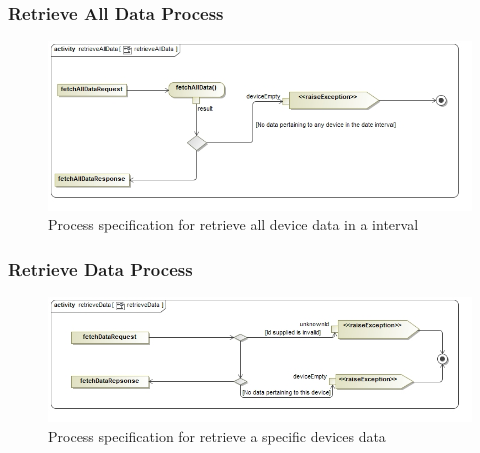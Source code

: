 \documentclass{article}
\begin{document}
	\subsubsection{Retrieve All Data Process}
	\begin{figure}[H]
		\includegraphics[width=\textwidth]{images/retrieveAllData.jpg}
		\caption{Process specification for retrieve all device data in a interval \label{overflow}}
	\end{figure}
		\subsubsection{Retrieve Data Process}
		\begin{figure}[H]
			\includegraphics[width=\textwidth]{images/retrieveData.jpg}
			\caption{Process specification for retrieve a specific devices data \label{overflow}}
		\end{figure}
\end{document}
